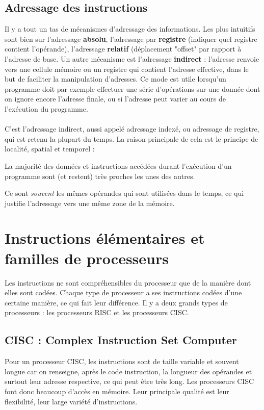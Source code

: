 \documentclass[12pt,a4paper]{report}
\begin{document}
\subsection{Adressage des instructions}
Il y a tout un tas de mécanismes d'adressage des informations. Les plus intuitifs sont bien sur l'adressage \textbf{absolu}, l'adressage par \textbf{registre} (indiquer quel registre contient l'opérande), l'adressage \textbf{relatif} (déplacement "offset" par rapport à l'adresse de base. Un autre mécanisme est l'adressage \textbf{indirect} : l'adresse renvoie vers une cellule mémoire ou un registre qui contient l'adresse effective, dans le but de faciliter la manipulation d'adresses. Ce mode est utile lorsqu'un programme doit par exemple effectuer une série d'opérations sur une donnée dont on ignore encore l'adresse finale, ou si l'adresse peut varier au cours de l'exécution du programme.\\
\\
C'est l'adressage indirect, aussi appelé adressage indexé, ou adressage de registre, qui est retenu la plupart du temps. La raison principale de cela est le principe de localité, spatial et temporel :
\begin{description}[leftmargin=!, labelwidth=\widthof{\bfseries Temporelle}]
\item[Spatiale] La majorité des données et instructions accédées durant l'exécution d'un programme sont (et restent) très proches les unes des autres.
\item[Temporelle] Ce sont \textit{souvent} les mêmes opérandes qui sont utilisées dans le temps, ce qui justifie l'adressage vers une même zone de la mémoire.
\end{description}
\section{Instructions élémentaires et familles de processeurs}
Les instructions ne sont compréhensibles du processeur que de la manière dont elles sont codées. Chaque type de processeur a ses instructions codées d'une certaine manière, ce qui fait leur différence. Il y a deux grands types de processeurs : les processeurs RISC et les processeurs CISC.
\subsection{CISC : Complex Instruction Set Computer}
Pour un processeur CISC, les instructions sont de taille variable et souvent longue car on renseigne, après le code instruction, la longueur des opérandes et surtout leur adresse respective, ce qui peut être très long. Les processeurs CISC font donc beaucoup d'accès en mémoire. Leur principale qualité est leur flexibilité, leur large variété d'instructions.
\end{document}
